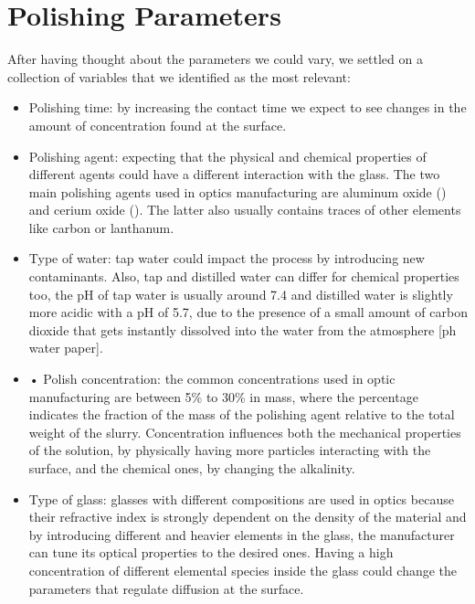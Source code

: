 \section{Polishing Parameters}
\label{sec:pol_parameter}
After having thought about the parameters we could vary, we settled on a collection of variables that we identified as the most relevant:
\begin{itemize}
    \item Polishing time: by increasing the contact time we expect to see changes in the amount of concentration found at the surface.
    \item Polishing agent: expecting that the physical and chemical properties of different agents could have a different interaction with the glass. The two main polishing agents used in optics manufacturing are aluminum oxide () and cerium oxide (). The latter also usually contains traces of other elements like carbon or lanthanum.
    \item Type of water: tap water could impact the process by introducing new contaminants. Also, tap and distilled water can differ for chemical properties too, the pH of tap water is usually around 7.4 and distilled water is slightly more acidic with a pH of 5.7, due to the presence of a small amount of carbon dioxide that gets instantly dissolved into the water from the atmosphere [ph water paper].
    \item •	Polish concentration: the common concentrations used in optic manufacturing are between 5\% to 30\% in mass, where the percentage indicates the fraction of the mass of the polishing agent relative to the total weight of the slurry. Concentration influences both the mechanical properties of the solution, by physically having more particles interacting with the surface, and the chemical ones, by changing the alkalinity.
    \item Type of glass: glasses with different compositions are used in optics because their refractive index is strongly dependent on the density of the material and by introducing different and heavier elements in the glass, the manufacturer can tune its optical properties to the desired ones. Having a high concentration of different elemental species inside the glass could change the parameters that regulate diffusion at the surface.
\end{itemize}

